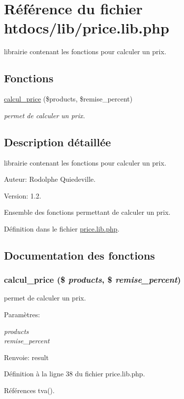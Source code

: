 \hypertarget{price_8lib_8php}{
\section{R\'{e}f\'{e}rence du fichier htdocs/lib/price.lib.php}
\label{price_8lib_8php}
}
librairie contenant les fonctions pour calculer un prix.  


\subsection*{Fonctions}
\begin{CompactItemize}
\item 
\hyperlink{price_8lib_8php_a0}{calcul\_\-price} (\$products, \$remise\_\-percent)
\begin{CompactList}\small\item\em permet de calculer un prix. \item\end{CompactList}\end{CompactItemize}


\subsection{Description d\'{e}taill\'{e}e}
librairie contenant les fonctions pour calculer un prix. 

\begin{Desc}
\item[Auteur:]Rodolphe Quiedeville. \end{Desc}
\begin{Desc}
\item[Version:]1.2.\end{Desc}
Ensemble des fonctions permettant de calculer un prix.

D\'{e}finition dans le fichier \hyperlink{price_8lib_8php-source}{price.lib.php}.

\subsection{Documentation des fonctions}
\hypertarget{price_8lib_8php_a0}{
\subsubsection[calcul\_\-price]{\setlength{\rightskip}{0pt plus 5cm}calcul\_\-price (\$ {\em products}, \$ {\em remise\_\-percent})}}
\label{price_8lib_8php_a0}


permet de calculer un prix. 

\begin{Desc}
\item[Param\`{e}tres:]
\begin{description}
\item[{\em products}]\item[{\em remise\_\-percent}]\end{description}
\end{Desc}
\begin{Desc}
\item[Renvoie:]result \end{Desc}


D\'{e}finition \`{a} la ligne 38 du fichier price.lib.php.

R\'{e}f\'{e}rences tva().